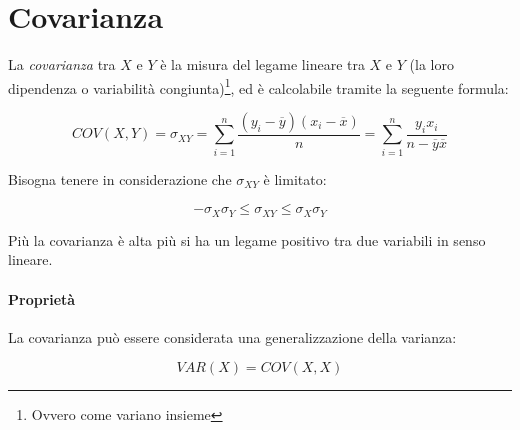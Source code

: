 \section{Covarianza}

La \textit{covarianza} tra $X$ e $Y$ \`e la misura del legame lineare tra $X$ e 
$Y$ (la loro dipendenza o variabilit\`a congiunta)\footnote{Ovvero come 
variano insieme}, ed \`e calcolabile tramite la seguente formula:

\[ COV(X,Y) = \sigma_{XY} = \sum_{i=1}^n \frac{(y_i - \overline{y}) (x_i - 
\overline{x})}{n} = \sum_{i=1}^n \frac{y_i x_i}{n - \overline{y} \overline{x}} 
\]

Bisogna tenere in considerazione che $\sigma_{XY}$ \`e limitato:

\[ -\sigma_X \sigma_Y \le \sigma_{XY} \le \sigma_X \sigma_Y \]

Pi\`u la covarianza \`e alta pi\`u si ha un legame positivo tra due variabili 
in senso lineare.

\paragraph*{Propriet\`a}
La covarianza pu\`o essere considerata una generalizzazione della varianza:

\[ VAR(X) = COV(X,X)  \]